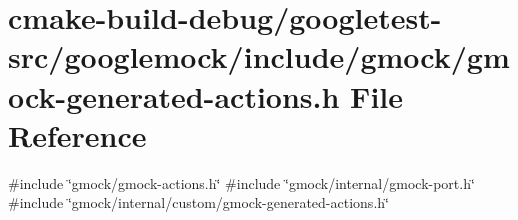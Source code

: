 \hypertarget{gmock-generated-actions_8h}{}\section{cmake-\/build-\/debug/googletest-\/src/googlemock/include/gmock/gmock-\/generated-\/actions.h File Reference}
\label{gmock-generated-actions_8h}
{\ttfamily \#include \char`\"{}gmock/gmock-\/actions.\+h\char`\"{}}\newline
{\ttfamily \#include \char`\"{}gmock/internal/gmock-\/port.\+h\char`\"{}}\newline
{\ttfamily \#include \char`\"{}gmock/internal/custom/gmock-\/generated-\/actions.\+h\char`\"{}}\newline
